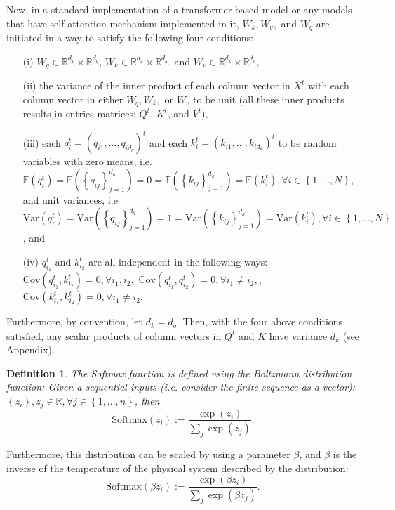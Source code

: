 \documentclass{article}
\theoremstyle{plain}
\theoremstyle{plain} %
\newtheorem{definition}[theorem]{Definition}
\theoremstyle{definition}  %
\theoremstyle{remark}  %
\theoremstyle{plain}
\begin{document}
Now, in a standard implementation of a transformer-based model or any models that have self-attention mechanism implemented in it, $W_k, W_v,$ and $W_q$ are initiated in a way to satisfy the following four conditions:
\begin{itemize}
\item[(i)] $W_q\in\mathbb{R}^{d_x}\times\mathbb{R}^{d_q}$, $W_k\in\mathbb{R}^{d_x}\times\mathbb{R}^{d_k}$, and $W_v\in\mathbb{R}^{d_x} \times \mathbb{R}^{d_v}$,
\item[(ii)] the variance of the inner product of each column vector in $X^t$ with each column vector in either $W_q, W_k,$ or $W_v$ to be unit (all these inner products results in entries matrices: $Q^t$, $K^t$, and $V^t$),
\item[(iii)] each $q_i^t=(q_{i1},...,q_{id_q})^t$ and each $k_i^t=(k_{i1},...,k_{id_k})^t$ to be random variables with zero means, i.e. $\mathbb{E}\left( q_i^t \right) = \mathbb{E}\left(\left\lbrace q_{ij} \right\rbrace_{j=1}^{d_q}\right) =0=\mathbb{E} \left(\left\lbrace k_{ij} \right\rbrace_{j=1}^{d_k}\right)=\mathbb{E}\left( k_i^t \right), \forall i\in\left\lbrace 1,...,N\right\rbrace$, and unit variances, i.e $\text{Var}\left(q^t_i\right) =\text{Var}\left(\left\lbrace q_{ij} \right\rbrace_{j=1}^{d_q}\right) =1=\text{Var} \left(\left\lbrace k_{ij} \right\rbrace_{j=1}^{d_k}\right)=\text{Var}\left(k^t_i\right), \forall i\in\left\lbrace 1,...,N\right\rbrace$, and
\item[(iv)] $q_{i_1}^t$ and $k_{i_2}^t$ are all independent in the following ways: $\text{Cov}\left( q^t_{i_1},k^t_{i_2}\right)=0, \forall i_1,i_2,$ $\text{Cov}\left( q^t_{i_1},q^t_{i_2}\right)=0, \forall i_1\neq i_2,$, $\text{Cov}\left( k^t_{i_1},k^t_{i_2}\right)=0, \forall i_1\neq i_2.$ 
\end{itemize}
Furthermore, by convention, let $d_k=d_q$. Then, with the four above conditions satisfied, any scalar products of column vectors in $Q^t$ and $K$ have variance $d_k$ (see Appendix).

\begin{definition}
The Softmax function is defined using the Boltzmann distribution function: Given a sequential inputs (i.e. consider the finite sequence as a vector): $\left\lbrace z_i\right\rbrace, z_j\in\mathbb{R},\forall j\in\left\lbrace 1,...,n\right\rbrace$, then 
$$
\text{Softmax}(z_i) := \frac{\exp\left(z_i \right) }{\sum\limits_j \exp\left(z_j \right)}.
$$
\end{definition}

Furthermore, this distribution can be scaled by using a parameter $\beta$, and $\beta$ is the inverse of the temperature of the physical system described by the distribution:
$$
\text{Softmax}(\beta z_i) := \frac{\exp\left(\beta z_i \right) }{\sum\limits_j \exp\left(\beta z_j \right)}.
$$
\end{document}
